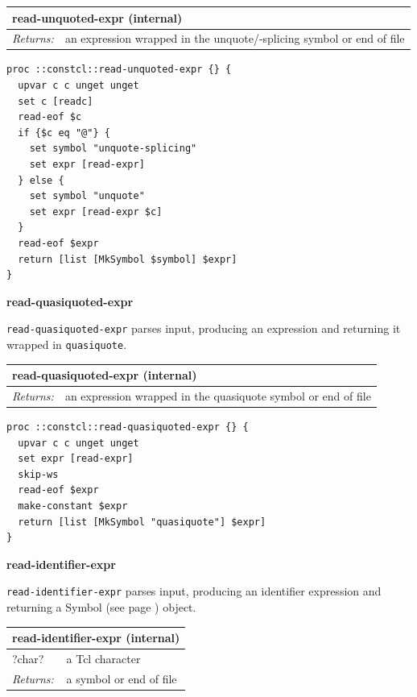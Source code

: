 \documentclass[twoside,9pt]{report}
\begin{document}
\begin{tabular}{ |l l| }
\hline
\multicolumn{2}{|l|}{read-unquoted-expr (internal)} \\
\hline
\textit{Returns:} & an expression wrapped in the unquote/-splicing symbol or end of file \\
\hline
\end{tabular}

\noindent\makebox[\linewidth]{\rule{\linewidth}{0.4pt}}
\begin{lstlisting}
proc ::constcl::read-unquoted-expr {} {
  upvar c c unget unget
  set c [readc]
  read-eof $c
  if {$c eq "@"} {
    set symbol "unquote-splicing"
    set expr [read-expr]
  } else {
    set symbol "unquote"
    set expr [read-expr $c]
  }
  read-eof $expr
  return [list [MkSymbol $symbol] $expr]
}
\end{lstlisting}
\noindent\makebox[\linewidth]{\rule{\linewidth}{0.4pt}}

\textbf{read-quasiquoted-expr}


\texttt{read-quasiquoted-expr} parses input, producing an expression and returning it wrapped in \texttt{quasiquote}.

\begin{tabular}{ |l l| }
\hline
\multicolumn{2}{|l|}{read-quasiquoted-expr (internal)} \\
\hline
\textit{Returns:} & an expression wrapped in the quasiquote symbol or end of file \\
\hline
\end{tabular}

\noindent\makebox[\linewidth]{\rule{\linewidth}{0.4pt}}
\begin{lstlisting}
proc ::constcl::read-quasiquoted-expr {} {
  upvar c c unget unget
  set expr [read-expr]
  skip-ws
  read-eof $expr
  make-constant $expr
  return [list [MkSymbol "quasiquote"] $expr]
}
\end{lstlisting}
\noindent\makebox[\linewidth]{\rule{\linewidth}{0.4pt}}

\textbf{read-identifier-expr}


\texttt{read-identifier-expr} parses input, producing an identifier expression and returning a Symbol (see page \pageref{symbols}) object.

\begin{tabular}{ |l l| }
\hline
\multicolumn{2}{|l|}{read-identifier-expr (internal)} \\
\hline
?char? & a Tcl character \\
\textit{Returns:} & a symbol or end of file \\
\hline
\end{tabular}
\end{document}
